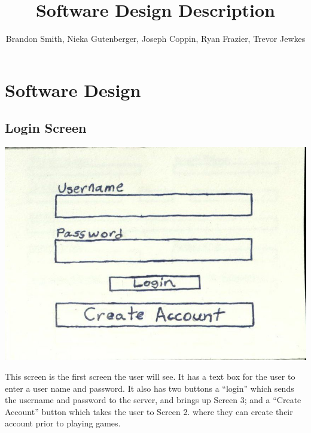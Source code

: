 \documentclass[]{scrartcl}
\title{Software Design Description}
\author{Brandon Smith, Nieka Gutenberger, Joseph Coppin, Ryan Frazier, Trevor Jewkes}
\begin{document}
\maketitle
\section{Software Design}
\subsection{Login Screen}

\centerline{\includegraphics{1.jpg}}

This screen is the first screen the user will see.  It has a text box for the user to enter a user name and password.  It also has two buttons a “login” which sends the username and password to the server, and brings up Screen 3; and a “Create Account” button which takes the user to Screen 2. where they can create their account prior to playing games. 
\end{document}
